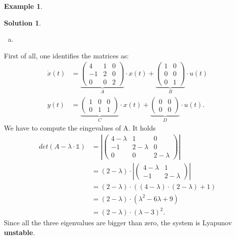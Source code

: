 \documentclass[a4paper,12 pt]{article}
\numberwithin{equation}{section}
\theoremstyle{definition}
\newtheorem{bsp}{Example}
\theoremstyle{remark}
\theoremstyle{definition}
\newtheorem*{lsg}{Solution}
\theoremstyle{definition}
\theoremstyle{definition}
\theoremstyle{remark}
\begin{document}
\begin{bsp}
\newpage
\begin{lsg}
\
\begin{enumerate}[(a)]
\item
\end{enumerate}
First of all, one identifies the matrices as:
\begin{equation}
\begin{split}
\dot{x}(t)&=\underbrace{\begin{pmatrix}
4&1&0\\
-1&2&0\\
0&0&2
\end{pmatrix}}_{A}\cdot x(t)+\underbrace{\begin{pmatrix}
1&0\\
0&0\\
0&1
\end{pmatrix}}_{B}\cdot u(t)\\
y(t)&=\underbrace{\begin{pmatrix} 1&0&0\\ 0&1&1\end{pmatrix}}_{C} \cdot x(t)+\underbrace{\begin{pmatrix} 0&0\\ 0&0\end{pmatrix}}_{D}\cdot u(t).
\end{split}
\end{equation}
We have to compute the eingevalues of A. It holds
\begin{equation*}
\begin{split}
det(A-\lambda\cdot \mathbb{1})&=|\begin{pmatrix} 
4-\lambda&1&0\\
-1&2-\lambda&0\\
0&0&2-\lambda
\end{pmatrix}|\\
&=(2-\lambda)\cdot |\begin{pmatrix} 4-\lambda&1\\
-1&2-\lambda \end{pmatrix}|\\
&= (2-\lambda)\cdot \left( (4-\lambda)\cdot(2-\lambda)+1\right)\\
&=(2-\lambda)\cdot (\lambda^2-6\lambda+9)\\
&=(2-\lambda)\cdot (\lambda-3)^2.
\end{split}
\end{equation*}
Since all the three eigenvalues are bigger than zero, the system is Lyapunov \textbf{unstable}.
\begin{enumerate}[(b)]

\end{enumerate}
\end{lsg}
\end{bsp}
\end{document}
